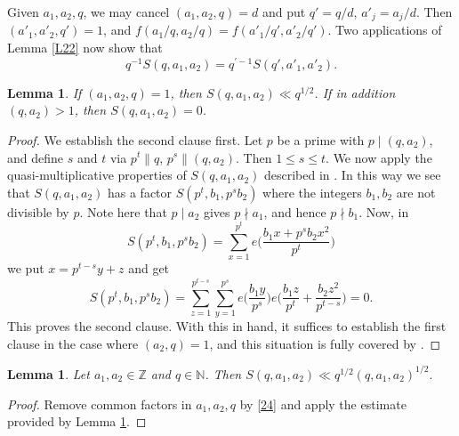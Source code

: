 \documentclass[reqno]{amsart}
\newtheorem{lemma}[thm]{Lemma}
\numberwithin{equation}{section}
\begin{document}
Given $a_1,a_2,q$, we may cancel $(a_1,a_2,q)=d$ and put $q' = q/d$, $a'_j=a_j/d$. Then $(a'_1,a'_2,q')=1$, and $f(a_1/q,a_2/q) = f(a'_1/q',a'_2/q')$. Two applications of Lemma \ref{L22} now show that
\begin{equation}\label{24} q^{-1}S(q,a_1,a_2)= q^{\prime -1} S(q',a'_1,a'_2). \end{equation}

\begin{lemma}\label{L23} If $(a_1,a_2,q)=1$, then $S(q,a_1,a_2)\ll q^{1/2}$. If in addition $(q,a_2)>1$, then $S(q,a_1,a_2)=0$. \end{lemma}

\begin{proof}
We establish the second clause first. Let $p$ be a prime with $p\mid (q,a_2)$, and define $s$ and $t$ via $p^t\parallel  q$, $p^s\parallel (q,a_2)$. Then $1\le s\le t$. We now apply the quasi-multiplicative properties of $S(q,a_1,a_2)$ described in \cite[Lemma 4.1]{hlm}. In this way we see that $S(q,a_1,a_2)$ has a factor
$S(p^t,b_1,p^sb_2)$ where the integers $b_1,b_2$ are not divisible by $p$. Note here that $p\mid a_2$ gives $p\nmid a_1$, and hence $p\nmid b_1$. Now, in
$$ S(p^t,b_1,p^sb_2) = \sum_{x=1}^{p^t} e\Big( \frac{b_1x+p^sb_2 x^2}{p^t}\Big)$$
we put $x=p^{t-s}y+z$ and get
$$ S(p^t,b_1,p^sb_2) = \sum_{z=1}^{p^{t-s}} \sum_{y=1}^{p^s} e\Big(\frac{b_1y}{p^s}\Big) e\Big(\frac{b_1 z}{p^t} + \frac{b_2z^2}{p^{t-s}}\Big) = 0. $$
This proves the second clause. With this in hand, it suffices to establish the first clause in the case where $(a_2,q)=1$, and this situation is fully covered by \cite[Lemma 2.1]{gen}. 
\end{proof}

\begin{lemma} \label{L24}Let $a_1,a_2\in\mathbb Z$ and $q\in\mathbb N$. Then
$S(q,a_1,a_2) \ll q^{1/2} (q,a_1,a_2)^{1/2}. $
\end{lemma} 

\begin{proof}
Remove common factors in $a_1,a_2,q$ by \eqref{24} and apply the estimate provided by Lemma \ref{L23}.
\end{proof}
\end{document}
